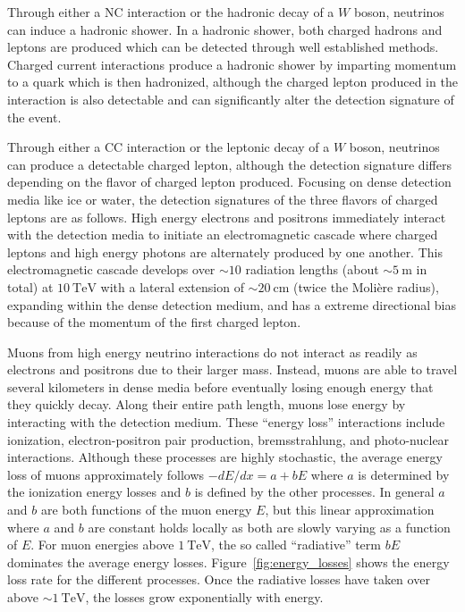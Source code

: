 Through either a NC interaction or the hadronic decay of a $W$ boson, neutrinos can induce a hadronic shower.
In a hadronic shower, both charged hadrons and leptons are produced which can be detected through well established methods.
Charged current interactions produce a hadronic shower by imparting momentum to a quark which is then hadronized, although the charged lepton produced in the interaction is also detectable and can significantly alter the detection signature of the event.

Through either a CC interaction or the leptonic decay of a $W$ boson, neutrinos can produce a detectable charged lepton, although the detection signature differs depending on the flavor of charged lepton produced.
Focusing on dense detection media like ice or water, the detection signatures of the three flavors of charged leptons are as follows.
High energy electrons and positrons immediately interact with the detection media to initiate an electromagnetic cascade where charged leptons and high energy photons are alternately produced by one another.
This electromagnetic cascade develops over $\sim10$ radiation lengths (about $\sim\SI{5}\m$ in total) at $\SI{10}\TeV$ with a lateral extension of $\sim\SI{20}\cm$ (twice the Molière radius), expanding within the dense detection medium, and has a extreme directional bias because of the momentum of the first charged lepton.

Muons from high energy neutrino interactions do not interact as readily as electrons and positrons due to their larger mass.
Instead, muons are able to travel several kilometers in dense media before eventually losing enough energy that they quickly decay.
Along their entire path length, muons lose energy by interacting with the detection medium.
These ``energy loss'' interactions include ionization, electron-positron pair production, bremsstrahlung, and photo-nuclear interactions.
Although these processes are highly stochastic, the average energy loss of muons approximately follows $-dE/dx=a+bE$ where $a$ is determined by the ionization energy losses and $b$ is defined by the other processes.
In general $a$ and $b$ are both functions of the muon energy $E$, but this linear approximation where $a$ and $b$ are constant holds locally as both are slowly varying as a function of $E$.
For muon energies above $\SI{1}\TeV$, the so called ``radiative'' term $bE$ dominates the average energy losses.
Figure~\ref{fig:energy_losses} shows the energy loss rate for the different processes.
Once the radiative losses have taken over above $\sim\SI{1}\TeV$, the losses grow exponentially with energy.

